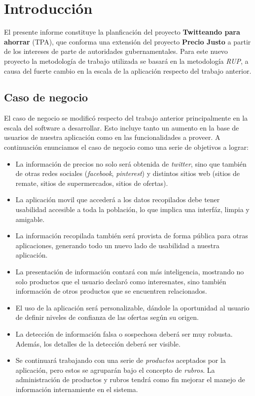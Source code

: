 \documentclass[10pt, a4paper]{article}
\begin{document}
\maketitle
\tableofcontents
\newpage

\section{Introducción}

El presente informe constituye la planficación del proyecto \textbf{Twitteando para ahorrar} (TPA), que conforma una extensión del proyecto \textbf{Precio Justo} a partir de los intereses de parte de autoridades gubernamentales. Para este nuevo proyecto la metodología de trabajo utilizada se basará en la metodología \emph{RUP}, a causa del fuerte cambio en la escala de la aplicación respecto del trabajo anterior.  

\subsection{Caso de negocio}

El caso de negocio se modificó respecto del trabajo anterior principalmente en la escala del software a desarrollar. Esto incluye tanto un aumento en la base de usuarios de nuestra aplicación como en las funcionalidades a proveer. A continuación enunciamos el caso de negocio como una serie de objetivos a lograr:

\begin{itemize}
\item La información de precios no solo será obtenida de \emph{twitter}, sino que también de otras redes sociales (\emph{facebook}, \emph{pinterest}) y distintos sitios web (sitios de remate, sitios de supermercados, sitios de ofertas).
\item La aplicación movil que accederá a los datos recopilados debe tener usabilidad accesible a toda la población, lo que implica una interfáz, limpia y amigable.
\item La información recopilada también será provista de forma pública para otras aplicaciones, generando todo un nuevo lado de usabilidad a nuestra aplicación.
\item La presentación de información contará con más inteligencia, mostrando no solo productos que el usuario declaró como interesnates, sino también información de otros productos que se encuentren relacionados.
\item El uso de la aplicación será personalizable, dándole la oportunidad al usuario de definir niveles de confianza de las ofertas según su origen.
\item La detección de información falsa o sospechosa deberá ser muy robusta. Además, los detalles de la detección deberá ser visible.
\item Se continuará trabajando con una serie de \emph{productos} aceptados por la aplicación, pero estos se agruparán bajo el concepto de \emph{rubros}. La administración de productos y rubros tendrá como fin mejorar el manejo de información internamiente en el sistema.
\end{itemize}
\end{document}
